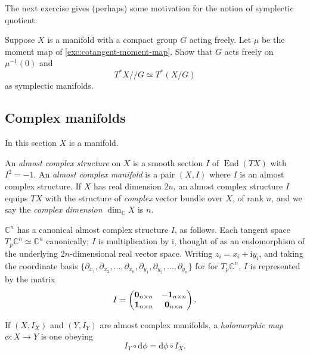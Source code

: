\documentclass[12pt,letterpaper,reqno]{article}
\numberwithin{equation}{section}
\newcommand{\C}{\ensuremath{\mathbb C}}
\newcommand{\kq}{/\!\!/}
\newcommand{\I}{{\mathrm i}}
\newcommand{\de}{\mathrm{d}}
\newcommand{\ti}[1]{\textit{#1}}
\DeclareMathOperator{\End}{End}
\begin{document}
The next exercise gives (perhaps) some motivation
for the notion of symplectic quotient:

\begin{exercise} \label{exc:cotangent-symplectic-quotients} 
Suppose $X$ is a manifold
with a compact group $G$ acting freely. Let $\mu$
be the moment map of \autoref{exc:cotangent-moment-map}.
Show that $G$ acts freely on $\mu^{-1}(0)$ and
\begin{equation}
T^*X \kq G \simeq T^*(X/G)
\end{equation}
as symplectic manifolds.
\end{exercise}


\subsection{Complex manifolds} 
In this section $X$ is a manifold.

\begin{defn}
An \ti{almost complex structure} on $X$ is a smooth section $I$ of $\End(TX)$ with $I^2 = -1$. An \ti{almost complex manifold} is a pair $(X,I)$ where $I$ is an almost complex structure.
If $X$ has real dimension $2n$, an almost complex
structure $I$ equips $TX$ with the structure of
\ti{complex} vector bundle over $X$, of rank $n$,
and we say the \ti{complex dimension} $\dim_\C X$ is
$n$.
\end{defn}

\begin{example} $\C^n$ has a canonical almost complex structure $I$, as follows. Each tangent space $T_p \C^n \simeq \C^n$ canonically; $I$ is multiplication by $\I$, thought of as an 
endomorphism of the underlying $2n$-dimensional real vector space.
Writing $z_i = x_i + \I y_i$, and taking the coordinate basis
$\{\partial_{x_1}, \partial_{x_2}, \dots, \partial_{x_n}, \partial_{y_1}, \partial_{y_2}, \dots, \partial_{y_n}\}$ for for $T_p \C^n$, $I$ is represented by the matrix
\begin{equation}
   I = \begin{pmatrix} {\bf 0}_{n \times n} & -{\bf 1}_{n \times n} \\ {\bf 1}_{n \times n} & {\bf 0}_{n \times n} \end{pmatrix}.
\end{equation}
\end{example}

\begin{defn} \label{def:holomorphic-maps} If $(X,I_X)$ and $(Y,I_Y)$ are almost
complex manifolds, a \ti{holomorphic map} $\phi: X \to Y$
is one obeying
\begin{equation}
 I_Y \circ \de \phi = \de \phi \circ I_X.  
\end{equation}
\end{defn}
\end{document}
